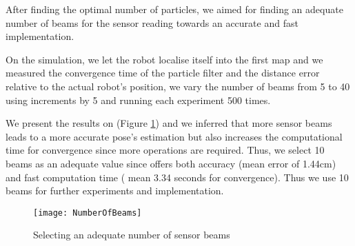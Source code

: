 	
	After finding the optimal number of particles, we aimed for finding an adequate number of beams for the sensor reading towards an accurate and fast implementation.
	
	On the simulation, we let the robot localise itself into the first map and we measured the convergence time of the particle filter and the distance error relative to the actual robot's position, we vary the number of beams from 5 to 40 using increments by 5 and running each experiment 500 times. 
	
	We present the results on (Figure \ref{fig:NumBeams}) and we  inferred that more sensor beams leads to a more accurate pose's estimation but also increases the computational time for convergence since more operations are required. Thus, we select 10 beams as an adequate value since offers both accuracy (mean error of 1.44cm) and fast computation time ( mean 3.34 seconds for convergence). Thus we use 10 beams for further experiments and implementation. 
	
	
	\begin{figure}[h]
    \centering
		\texttt{[image: NumberOfBeams]}
      \caption{Selecting an adequate number of sensor beams}
    \label{fig:NumBeams}
 	\end{figure}
	

	 
\FloatBarrier
	
	